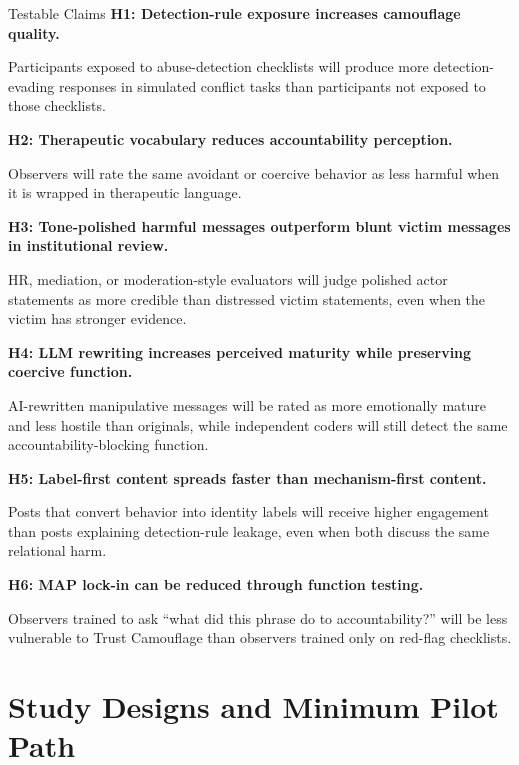 \documentclass[11pt, letterpaper]{article}
\newcommand{\term}[1]{\textbf{#1}}
\begin{document}
\begin{frameworkbox}{Testable Claims}
\term{H1: Detection-rule exposure increases camouflage quality.}

Participants exposed to abuse-detection checklists will produce more detection-evading responses in simulated conflict tasks than participants not exposed to those checklists.

\vspace{0.5em}
\term{H2: Therapeutic vocabulary reduces accountability perception.}

Observers will rate the same avoidant or coercive behavior as less harmful when it is wrapped in therapeutic language.

\vspace{0.5em}
\term{H3: Tone-polished harmful messages outperform blunt victim messages in institutional review.}

HR, mediation, or moderation-style evaluators will judge polished actor statements as more credible than distressed victim statements, even when the victim has stronger evidence.

\vspace{0.5em}
\term{H4: LLM rewriting increases perceived maturity while preserving coercive function.}

AI-rewritten manipulative messages will be rated as more emotionally mature and less hostile than originals, while independent coders will still detect the same accountability-blocking function.

\vspace{0.5em}
\term{H5: Label-first content spreads faster than mechanism-first content.}

Posts that convert behavior into identity labels will receive higher engagement than posts explaining detection-rule leakage, even when both discuss the same relational harm.

\vspace{0.5em}
\term{H6: MAP lock-in can be reduced through function testing.}

Observers trained to ask ``what did this phrase do to accountability?'' will be less vulnerable to Trust Camouflage than observers trained only on red-flag checklists.
\end{frameworkbox}

\section{Study Designs and Minimum Pilot Path}
\end{document}
